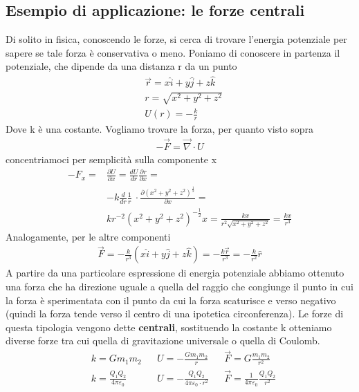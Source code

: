 \documentclass[10pt,a4paper]{article}
\begin{document}
\subsection{Esempio di applicazione: le forze centrali}\label{sec:forzecentrali}
Di solito in fisica, conoscendo le forze, si cerca di trovare l'energia potenziale per sapere se tale forza è conservativa o meno. Poniamo di conoscere in partenza il potenziale, che dipende da una distanza r da un punto
\begin{align*}
&\vec{r} = x \hat{i} + y \hat{j} + z \hat{k}\\
&r = \sqrt{x^2+y^2+z^2}\\
&U(r) = -\frac{k}{r}
\end{align*}
Dove k è una costante. Vogliamo trovare la forza, per quanto visto sopra
\begin{align*}
-\vec{F} = \vec{\nabla} \cdot U
\end{align*}
concentriamoci per semplicità sulla componente x
\begin{align*}
-F_x =& \frac{\partial U}{\partial x} =  \frac{d U}{d r}  \frac{\partial r}{\partial x}=\\
&-k \frac{d}{d r}\frac{1}{r}\ \cdot \frac{\partial (x^2+y^2+z^2)^{\frac{1}{2}}}{\partial x} =\\
&kr^{-2} (x^2+y^2+z^2)^{-\frac{1}{2}} x = \frac{kx}{r^2 \sqrt{x^2+y^2+z^2}}= \frac{kx}{r^3}
\end{align*}
Analogamente, per le altre componenti
\begin{align*}
	\vec{F}= -\frac{k}{r^3}(x \hat{i} + y \hat{j} + z \hat{k})=-\frac{k\vec{r}}{r^3} = -\frac{k}{r^2}\hat{r}
\end{align*}
A partire da una particolare espressione di energia potenziale abbiamo ottenuto una forza che ha direzione uguale a quella del raggio che congiunge il punto in cui la forza è sperimentata con il punto da cui la forza scaturisce e verso negativo (quindi la forza tende verso il centro di una ipotetica circonferenza). Le forze di questa tipologia vengono dette \textbf{centrali}, sostituendo la costante k otteniamo diverse forze tra cui quella di gravitazione universale o quella di Coulomb.
\begin{align*}
	&k = G m_1 m_2 && U = -\frac{G m_1 m_2}{r} && \vec{F} = G\frac{m_1 m_2}{r^2}\\
	&k = \frac{Q_1 Q_2}{4 \pi \varepsilon_0} && U =-\frac{Q_1 Q_2}{4 \pi \varepsilon_0\cdot r^2} &&\vec{F} = \frac{1}{4 \pi \varepsilon_0}\frac{Q_1 Q_2}{r^2}
\end{align*}
\end{document}
